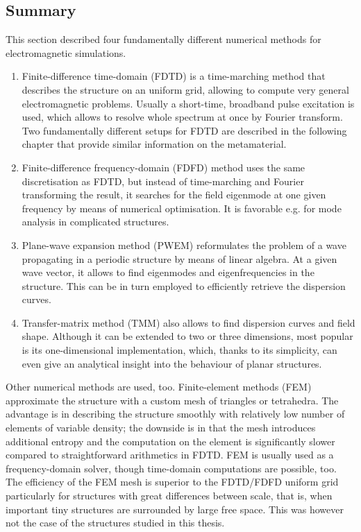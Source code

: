 \paragraph{} %

\subsection{Summary} %
This section described four fundamentally different numerical methods for electromagnetic simulations. 
\begin{enumerate}
\item{Finite-difference time-domain (FDTD) is a time-marching method that describes the structure on an uniform grid, allowing to compute very general electromagnetic problems. Usually a short-time, broadband pulse excitation is used, which allows to resolve whole spectrum at once by Fourier transform. Two fundamentally different setups for FDTD are described in the following chapter that provide similar information on the metamaterial.} 
\item{Finite-difference frequency-domain (FDFD) method uses the same discretisation as FDTD, but instead of time-marching and Fourier transforming the result, it searches for the field eigenmode at one given frequency by means of numerical optimisation. It is favorable e.g. for mode analysis in complicated structures.} 
\item{Plane-wave expansion method (PWEM) reformulates the problem of a wave propagating in a periodic structure by means of linear algebra. At a given wave vector, it allows to find eigenmodes and eigenfrequencies in the structure. This can be in turn employed to efficiently retrieve the dispersion curves.} 
\item{Transfer-matrix method (TMM) also allows to find dispersion curves and field shape. Although it can be extended to two or three dimensions, most popular is its one-dimensional implementation, which, thanks to its simplicity, can even give an analytical insight into the behaviour of planar structures.} 
\end{enumerate}
Other numerical methods are used, too. Finite-element methods (FEM) approximate the structure with a custom mesh of triangles or tetrahedra. The advantage is in describing the structure smoothly with relatively low number of elements of variable density; the downside is in that the mesh introduces additional entropy and the computation on the element is significantly slower compared to straightforward arithmetics in FDTD. FEM is usually used as a frequency-domain solver, though time-domain computations are possible, too. The efficiency of the FEM mesh is superior to the FDTD/FDFD uniform grid particularly for structures with great differences between scale, that is, when important tiny structures are surrounded by large free space. This was however not the case of the structures studied in this thesis.

